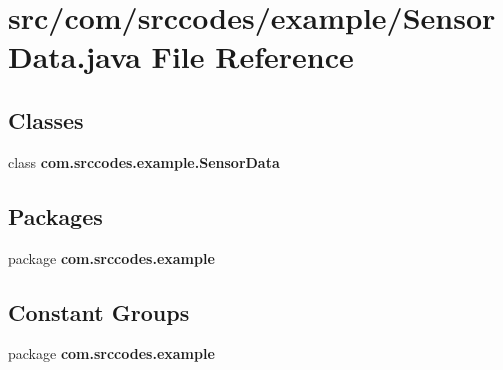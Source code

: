 \section{src/com/srccodes/example/\-Sensor\-Data.java File Reference}
\label{_sensor_data_8java}
\subsection*{Classes}
\begin{DoxyCompactItemize}
\item 
class {\bf com.\-srccodes.\-example.\-Sensor\-Data}
\end{DoxyCompactItemize}
\subsection*{Packages}
\begin{DoxyCompactItemize}
\item 
package {\bf com.\-srccodes.\-example}
\end{DoxyCompactItemize}
\subsection*{Constant Groups}
\begin{DoxyCompactItemize}
\item 
package {\bf com.\-srccodes.\-example}
\end{DoxyCompactItemize}
